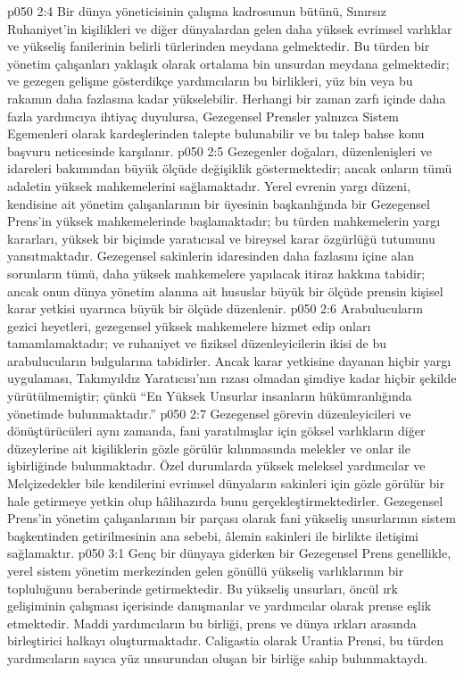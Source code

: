 \vs p050 2:4 Bir dünya yöneticisinin çalışma kadrosunun bütünü, Sınırsız Ruhaniyet’in kişilikleri ve diğer dünyalardan gelen daha yüksek evrimsel varlıklar ve yükseliş fanilerinin belirli türlerinden meydana gelmektedir. Bu türden bir yönetim çalışanları yaklaşık olarak ortalama bin unsurdan meydana gelmektedir; ve gezegen gelişme gösterdikçe yardımcıların bu birlikleri, yüz bin veya bu rakamın daha fazlasına kadar yükselebilir. Herhangi bir zaman zarfı içinde daha fazla yardımcıya ihtiyaç duyulursa, Gezegensel Prensler yalnızca Sistem Egemenleri olarak kardeşlerinden talepte bulunabilir ve bu talep bahse konu başvuru neticesinde karşılanır.
\vs p050 2:5 Gezegenler doğaları, düzenlenişleri ve idareleri bakımından büyük ölçüde değişiklik göstermektedir; ancak onların tümü adaletin yüksek mahkemelerini sağlamaktadır. Yerel evrenin yargı düzeni, kendisine ait yönetim çalışanlarının bir üyesinin başkanlığında bir Gezegensel Prens’in yüksek mahkemelerinde başlamaktadır; bu türden mahkemelerin yargı kararları, yüksek bir biçimde yaratıcısal ve bireysel karar özgürlüğü tutumunu yansıtmaktadır. Gezegensel sakinlerin idaresinden daha fazlasını içine alan sorunların tümü, daha yüksek mahkemelere yapılacak itiraz hakkına tabidir; ancak onun dünya yönetim alanına ait hususlar büyük bir ölçüde prensin kişisel karar yetkisi uyarınca büyük bir ölçüde düzenlenir.
\vs p050 2:6 Arabulucuların gezici heyetleri, gezegensel yüksek mahkemelere hizmet edip onları tamamlamaktadır; ve ruhaniyet ve fiziksel düzenleyicilerin ikisi de bu arabulucuların bulgularına tabidirler. Ancak karar yetkisine dayanan hiçbir yargı uygulaması, Takımyıldız Yaratıcısı’nın rızası olmadan şimdiye kadar hiçbir şekilde yürütülmemiştir; çünkü “En Yüksek Unsurlar insanların hükümranlığında yönetimde bulunmaktadır.”
\vs p050 2:7 Gezegensel görevin düzenleyicileri ve dönüştürücüleri aynı zamanda, fani yaratılmışlar için göksel varlıkların diğer düzeylerine ait kişiliklerin gözle görülür kılınmasında melekler ve onlar ile işbirliğinde bulunmaktadır. Özel durumlarda yüksek meleksel yardımcılar ve Melçizedekler bile kendilerini evrimsel dünyaların sakinleri için gözle görülür bir hale getirmeye yetkin olup hâlihazırda bunu gerçekleştirmektedirler. Gezegensel Prens’in yönetim çalışanlarının bir parçası olarak fani yükseliş unsurlarının sistem başkentinden getirilmesinin ana sebebi, âlemin sakinleri ile birlikte iletişimi sağlamaktır.
\vs p050 3:1 Genç bir dünyaya giderken bir Gezegensel Prens genellikle, yerel sistem yönetim merkezinden gelen gönüllü yükseliş varlıklarının bir topluluğunu beraberinde getirmektedir. Bu yükseliş unsurları, öncül ırk gelişiminin çalışması içerisinde danışmanlar ve yardımcılar olarak prense eşlik etmektedir. Maddi yardımcıların bu birliği, prens ve dünya ırkları arasında birleştirici halkayı oluşturmaktadır. Caligastia olarak Urantia Prensi, bu türden yardımcıların sayıca yüz unsurundan oluşan bir birliğe sahip bulunmaktaydı.

